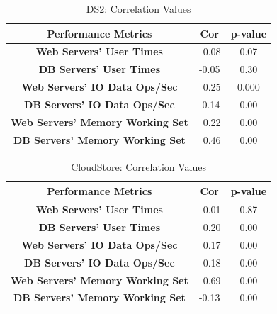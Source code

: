 \begin{table}[t]
	\centering
	\caption{DS2: Correlation Values}
	\label{resultRQ3}
	\begin{tabular}{c|cc}
		\toprule
		\textbf{Performance Metrics}   & \textbf{Cor} & \textbf{p-value}\\  
		\midrule 
		\midrule 
		\textbf{Web Servers' User Times} & \ 0.08 & 0.07\\
		\textbf{DB Servers' User Times} & -0.05 & 0.30\\
		\midrule 
		\textbf{Web Servers' IO Data Ops/Sec}   &\ 0.25 & 0.000 \\
		\textbf{DB Servers' IO Data Ops/Sec} & -0.14 & 0.00\\
		\midrule 
		\textbf{Web Servers' Memory Working Set} &\ 0.22 & 0.00\\
		\textbf{DB Servers' Memory Working Set} &\ 0.46 & 0.00\\
		\bottomrule             
	\end{tabular}
\end{table}
	
\begin{table}[t]
		\centering
		\caption{CloudStore: Correlation Values}
		\label{resultRQ3}
		\begin{tabular}{c|cc}
			\toprule
			\textbf{Performance Metrics}   & \textbf{Cor}& \textbf{p-value}\\
			\midrule 
			\midrule 
			\textbf{Web Servers' User Times} & \ 0.01& 0.87\\
			\textbf{DB Servers' User Times} & \ 0.20 & 0.00\\
			\midrule 
			\textbf{Web Servers' IO Data Ops/Sec}   & \ 0.17& 0.00 \\
			\textbf{DB Servers' IO Data Ops/Sec} & \ 0.18& 0.00\\
			\midrule 
			\textbf{Web Servers' Memory Working Set} &\ 0.69& 0.00\\
			\textbf{DB Servers' Memory Working Set} & -0.13 & 0.00\\
			\bottomrule             
		\end{tabular}
\end{table}



